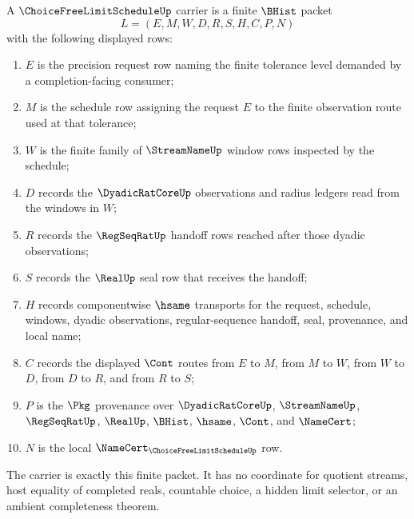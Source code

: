 \begin{definition}
\label{def:choice-free-limit-schedule-carrier}
A $\ChoiceFreeLimitScheduleUp$ carrier is a finite $\BHist$ packet
$$
L=(E,M,W,D,R,S,H,C,P,N)
$$
with the following displayed rows:
\begin{enumerate}
\item $E$ is the precision request row naming the finite tolerance level demanded by a completion-facing consumer;
\item $M$ is the schedule row assigning the request $E$ to the finite observation route used at that tolerance;
\item $W$ is the finite family of $\StreamNameUp$ window rows inspected by the schedule;
\item $D$ records the $\DyadicRatCoreUp$ observations and radius ledgers read from the windows in $W$;
\item $R$ records the $\RegSeqRatUp$ handoff rows reached after those dyadic observations;
\item $S$ records the $\RealUp$ seal row that receives the handoff;
\item $H$ records componentwise $\hsame$ transports for the request, schedule, windows, dyadic observations, regular-sequence handoff, seal, provenance, and local name;
\item $C$ records the displayed $\Cont$ routes from $E$ to $M$, from $M$ to $W$, from $W$ to $D$, from $D$ to $R$, and from $R$ to $S$;
\item $P$ is the $\Pkg$ provenance over $\DyadicRatCoreUp$, $\StreamNameUp$, $\RegSeqRatUp$, $\RealUp$, $\BHist$, $\hsame$, $\Cont$, and $\NameCert$;
\item $N$ is the local $\NameCert_{\ChoiceFreeLimitScheduleUp}$ row.
\end{enumerate}
The carrier is exactly this finite packet. It has no coordinate for quotient streams, host equality of completed reals, countable choice, a hidden limit selector, or an ambient completeness theorem.
\end{definition}

